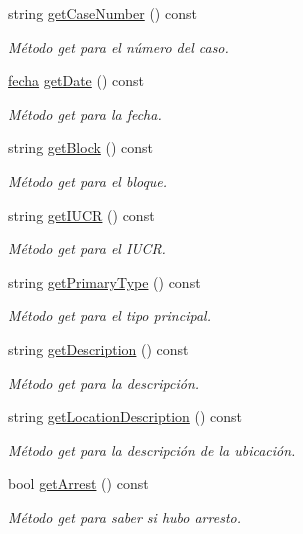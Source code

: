 \begin{DoxyCompactItemize}
string \hyperlink{classcrimen_ab3c025eb20cdcea9192ee190fa2af015}{get\-Case\-Number} () const 
\begin{DoxyCompactList}\small\item\em Método get para el número del caso. \end{DoxyCompactList}\item 
\hyperlink{classfecha}{fecha} \hyperlink{classcrimen_a8a6712e536211034819441ab87e1c215}{get\-Date} () const 
\begin{DoxyCompactList}\small\item\em Método get para la fecha. \end{DoxyCompactList}\item 
string \hyperlink{classcrimen_aa3a54622a596d8f2844b2d6a1822708a}{get\-Block} () const 
\begin{DoxyCompactList}\small\item\em Método get para el bloque. \end{DoxyCompactList}\item 
string \hyperlink{classcrimen_a8738020069c3a3b3500d044f9580f93a}{get\-I\-U\-C\-R} () const 
\begin{DoxyCompactList}\small\item\em Método get para el I\-U\-C\-R. \end{DoxyCompactList}\item 
string \hyperlink{classcrimen_ae47e93acec39b388cde221a679bccf9c}{get\-Primary\-Type} () const 
\begin{DoxyCompactList}\small\item\em Método get para el tipo principal. \end{DoxyCompactList}\item 
string \hyperlink{classcrimen_a61789d65209d167149df197272d8feba}{get\-Description} () const 
\begin{DoxyCompactList}\small\item\em Método get para la descripción. \end{DoxyCompactList}\item 
string \hyperlink{classcrimen_a9de655b3eea3592f6e5d017e83fd6060}{get\-Location\-Description} () const 
\begin{DoxyCompactList}\small\item\em Método get para la descripción de la ubicación. \end{DoxyCompactList}\item 
bool \hyperlink{classcrimen_a6cab67bfdad566ce444236fc7c8df312}{get\-Arrest} () const 
\begin{DoxyCompactList}\small\item\em Método get para saber si hubo arresto. \end{DoxyCompactList}\item 

\end{DoxyCompactItemize}
